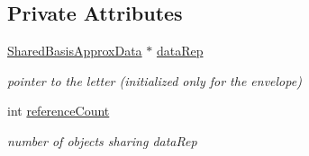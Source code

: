 \subsection*{Private Attributes}
\begin{DoxyCompactItemize}
\item 
\hyperlink{classPecos_1_1SharedBasisApproxData}{Shared\+Basis\+Approx\+Data} $\ast$ \hyperlink{classPecos_1_1SharedBasisApproxData_a2c1d81e571da5911b44f78ed161c69b0}{data\+Rep}\label{classPecos_1_1SharedBasisApproxData_a2c1d81e571da5911b44f78ed161c69b0}

\begin{DoxyCompactList}\small\item\em pointer to the letter (initialized only for the envelope) \end{DoxyCompactList}\item 
int \hyperlink{classPecos_1_1SharedBasisApproxData_afff0b6144883d3ca09a8d0d3f4776b0f}{reference\+Count}\label{classPecos_1_1SharedBasisApproxData_afff0b6144883d3ca09a8d0d3f4776b0f}

\begin{DoxyCompactList}\small\item\em number of objects sharing data\+Rep \end{DoxyCompactList}\end{DoxyCompactItemize}
